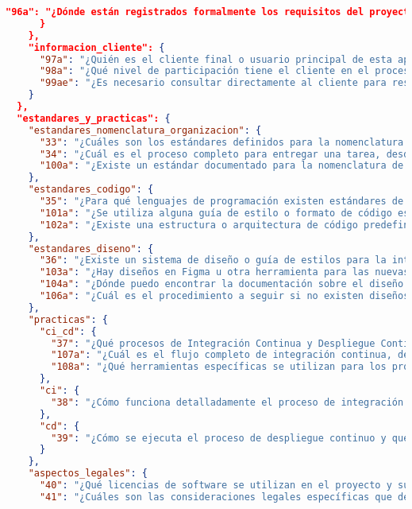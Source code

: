 \begin{lstlisting}[language=json, caption={Listado de elicitación de preguntas procesadas y clasificadas}, label={listado:preguntas}]
        "96a": "¿Dónde están registrados formalmente los requisitos del proyecto (Jira, Confluence, documentos, hojas de cálculo)?"
      }
    },
    "informacion_cliente": {
      "97a": "¿Quién es el cliente final o usuario principal de esta aplicación y cuál es su contexto de uso?",
      "98a": "¿Qué nivel de participación tiene el cliente en el proceso de desarrollo y toma de decisiones?",
      "99ae": "¿Es necesario consultar directamente al cliente para resolver dudas sobre determinadas funcionalidades o requisitos?"
    }
  },
  "estandares_y_practicas": {
    "estandares_nomenclatura_organizacion": {
      "33": "¿Cuáles son los estándares definidos para la nomenclatura y gestión de branches, commits y pull requests?",
      "34": "¿Cuál es el proceso completo para entregar una tarea, desde su finalización hasta la aprobación?",
      "100a": "¿Existe un estándar documentado para la nomenclatura de branches, commits y otros elementos del repositorio?"
    },
    "estandares_codigo": {
      "35": "¿Para qué lenguajes de programación existen estándares de codificación definidos en el proyecto?",
      "101a": "¿Se utiliza alguna guía de estilo o formato de código específico para cada lenguaje del proyecto?",
      "102a": "¿Existe una estructura o arquitectura de código predefinida que deba seguirse?"
    },
    "estandares_diseno": {
      "36": "¿Existe un sistema de diseño o guía de estilos para la interfaz de usuario?",
      "103a": "¿Hay diseños en Figma u otra herramienta para las nuevas pantallas o componentes a desarrollar?",
      "104a": "¿Dónde puedo encontrar la documentación sobre el diseño visual y la experiencia de usuario a implementar?",
      "106a": "¿Cuál es el procedimiento a seguir si no existen diseños definidos para un componente o pantalla?"
    },
    "practicas": {
      "ci_cd": {
        "37": "¿Qué procesos de Integración Continua y Despliegue Continuo (CI/CD) están implementados?",
        "107a": "¿Cuál es el flujo completo de integración continua, desde el commit hasta la validación?",
        "108a": "¿Qué herramientas específicas se utilizan para los procesos de integración y despliegue continuo?"
      },
      "ci": {
        "38": "¿Cómo funciona detalladamente el proceso de integración continua y qué validaciones incluye?"
      },
      "cd": {
        "39": "¿Cómo se ejecuta el proceso de despliegue continuo y qué entornos abarca?"
      }
    },
    "aspectos_legales": {
      "40": "¿Qué licencias de software se utilizan en el proyecto y sus dependencias?",
      "41": "¿Cuáles son las consideraciones legales específicas que deben tenerse en cuenta durante el desarrollo?",

\end{lstlisting}
